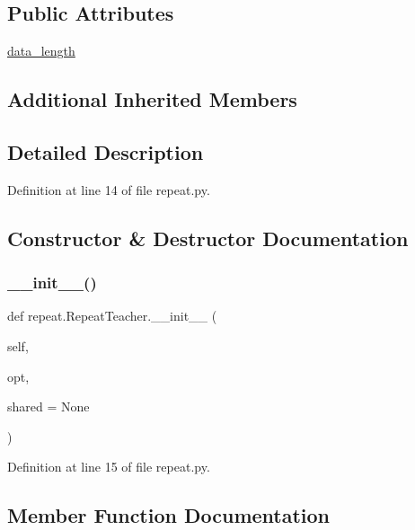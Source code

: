 \subsection*{Public Attributes}
\begin{DoxyCompactItemize}
\item 
\hyperlink{classrepeat_1_1RepeatTeacher_abc46f01649c8af2c60124d7946a95e98}{data\+\_\+length}
\end{DoxyCompactItemize}
\subsection*{Additional Inherited Members}


\subsection{Detailed Description}


Definition at line 14 of file repeat.\+py.



\subsection{Constructor \& Destructor Documentation}
\mbox{\label{classrepeat_1_1RepeatTeacher_a47b110b0dcdf457e357f1824fb348657}} 
\subsubsection{\texorpdfstring{\+\_\+\+\_\+init\+\_\+\+\_\+()}{\_\_init\_\_()}}
{\footnotesize\ttfamily def repeat.\+Repeat\+Teacher.\+\_\+\+\_\+init\+\_\+\+\_\+ (\begin{DoxyParamCaption}\item[{}]{self,  }\item[{}]{opt,  }\item[{}]{shared = {\ttfamily None} }\end{DoxyParamCaption})}



Definition at line 15 of file repeat.\+py.



\subsection{Member Function Documentation}
\mbox{\label{classrepeat_1_1RepeatTeacher_a9cafb9941e59acc751300cc481cbdf24}} 
